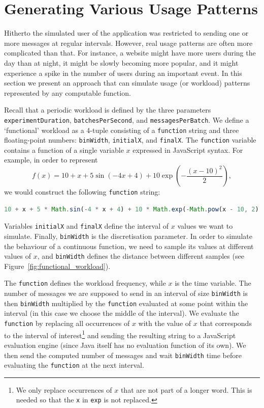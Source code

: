 \documentclass{article}
\begin{document}
\section{Generating Various Usage Patterns} \label{sec:usage_patterns}

Hitherto the simulated user of the application was restricted to sending one or
more messages at regular intervals. However, real usage patterns are often more
complicated than that. For instance, a website might have more users during the
day than at night, it might be slowly becoming more popular, and it might
experience a spike in the number of users during an important event. In this
section we present an approach that can simulate usage (or workload) patterns
represented by any computable function.

Recall that a periodic workload is defined by the three parameters
\texttt{experimentDuration}, \texttt{batchesPerSecond}, and
\texttt{messagesPerBatch}. We define a `functional' workload as a 4-tuple
consisting of a \texttt{function} string and three floating-point numbers:
\texttt{binWidth}, \texttt{initialX}, and \texttt{finalX}. The \texttt{function}
variable contains a function of a single variable $x$ expressed in JavaScript
syntax. For example, in order to represent
\begin{equation} \label{eq:example_function}
  f(x) = 10 + x + 5\sin(-4x + 4) + 10\exp \left( -\frac{(x - 10)^2}{2} \right),
\end{equation}
we would construct the following \texttt{function} string:
\begin{lstlisting}[language=JavaScript]
10 + x + 5 * Math.sin(-4 * x + 4) + 10 * Math.exp(-Math.pow(x - 10, 2) / 2).
\end{lstlisting}
Variables \texttt{initialX} and \texttt{finalX} define the interval of $x$
values we want to simulate. Finally, \texttt{binWidth} is the discretisation
parameter. In order to simulate the behaviour of a continuous function, we need
to sample its values at different values of $x$, and \texttt{binWidth} defines
the distance between different samples (see
Figure~\ref{fig:functional_workload}).

The \texttt{function} defines the workload frequency, while $x$ is the time
variable. The number of messages we are supposed to send in an interval of size
\texttt{binWidth} is then \texttt{binWidth} multiplied by the \texttt{function}
evaluated at some point within the interval (in this case we choose the middle
of the interval). We evaluate the \texttt{function} by replacing all occurrences
of $x$ with the value of $x$ that corresponds to the interval of
interest\footnote{We only replace occurrences of $x$ that are not part of a
  longer word. This is needed so that the \texttt{x} in \texttt{exp} is not
  replaced.} and sending the resulting string to a JavaScript evaluation engine
(since Java itself has no evaluation function of its own). We then send the
computed number of messages and wait \texttt{binWidth} time before evaluating
the \texttt{function} at the next interval.
\end{document}
